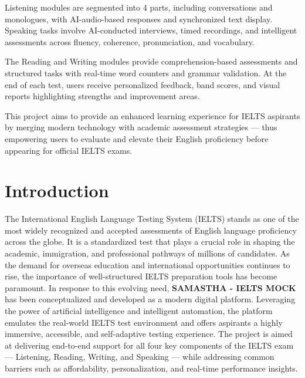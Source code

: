 \documentclass[a4paper,12pt]{article}
\begin{document}
\vspace{0.5cm}

Listening modules are segmented into 4 parts, including conversations and monologues, with AI-audio-based responses and synchronized text display. Speaking tasks involve AI-conducted interviews, timed recordings, and intelligent assessments across fluency, coherence, pronunciation, and vocabulary.

\vspace{0.5cm}

The Reading and Writing modules provide comprehension-based assessments and structured tasks with real-time word counters and grammar validation. At the end of each test, users receive personalized feedback, band scores, and visual reports highlighting strengths and improvement areas.

\vspace{0.5cm}

This project aims to provide an enhanced learning experience for IELTS aspirants by merging modern technology with academic assessment strategies — thus empowering users to evaluate and elevate their English proficiency before appearing for official IELTS exams.

\vspace{1.5cm}


\newpage
\section{Introduction}

\vspace{0.5cm}

The International English Language Testing System (IELTS) stands as one of the most widely recognized and accepted assessments of English language proficiency across the globe. It is a standardized test that plays a crucial role in shaping the academic, immigration, and professional pathways of millions of candidates. As the demand for overseas education and international opportunities continues to rise, the importance of well-structured IELTS preparation tools has become paramount. In response to this evolving need, \textbf{SAMASTHA - IELTS MOCK} has been conceptualized and developed as a modern digital platform. Leveraging the power of artificial intelligence and intelligent automation, the platform emulates the real-world IELTS test environment and offers aspirants a highly immersive, accessible, and self-adaptive testing experience. The project is aimed at delivering end-to-end support for all four key components of the IELTS exam — Listening, Reading, Writing, and Speaking — while addressing common barriers such as affordability, personalization, and real-time performance insights.
\end{document}
